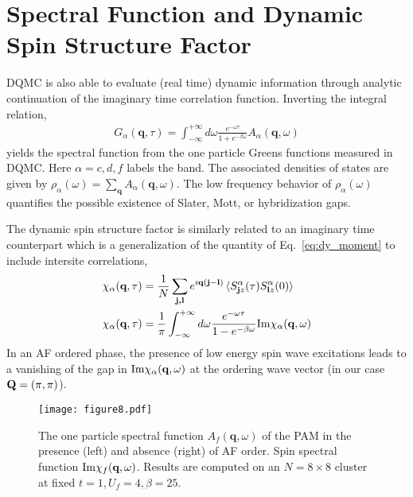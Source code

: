 \documentclass[pra,letterpaper,10pt,twocolumn]{revtex4}
\begin{document}
\section{Spectral Function and Dynamic Spin Structure Factor}

DQMC is also able to evaluate (real time) dynamic information through analytic
continuation\cite{jarrell96} of the imaginary time correlation function.
Inverting the integral relation,
\begin{align}
G_\alpha(\textbf{q},\tau)=\int_{-\infty}^{+\infty}d\omega
\frac{e^{-\omega \tau}}{1+e^{-\beta \omega}}
A_\alpha(\textbf{q},\omega)
\label{aqw}
\end{align}
yields the spectral function from the one particle Greens functions measured in
DQMC.  Here $\alpha=c,d,f$ labels the band.  The associated densities of
states are given by $\rho_\alpha(\omega) = \sum_{\textbf{q}} A_\alpha(\textbf{q},\omega)$.
The low frequency behavior of $\rho_\alpha(\omega)$ quantifies the
possible existence of Slater, Mott, or hybridization gaps.

The dynamic spin structure factor is similarly related to an imaginary
time counterpart which is a generalization of the quantity of
Eq.~\ref{eq:dy_moment} to include intersite correlations, 
\begin{align}
\chi_\alpha(\textbf{q},\tau)&=
\frac{1}{N} \sum_{\textbf{j,l}}
e^{i \textbf{q} (\textbf{j}-\textbf{l})}\,
\langle S^\alpha_{\textbf{j}z}(\tau)S^\alpha_{\textbf{l}z}(0) \rangle
\nonumber \\
\chi_\alpha(\textbf{q},\tau)&=\frac{1}{\pi}\int_{-\infty}^{+\infty} d\omega
\frac{e^{-\omega \tau}}{1-e^{-\beta \omega}} \textup{Im} \chi_\alpha(\textbf{q},\omega) \label{chiqw}
\end{align} 
In an AF ordered phase, the presence of low energy spin wave
excitations leads to a vanishing of the gap in $ \textup{Im} \chi_\alpha(\textbf{q},\omega)$
at the ordering wave vector (in our case ${\bf Q}=(\pi,\pi)$).

\begin{figure}[!h]
\texttt{[image: figure8.pdf]} 
\caption{ 
The one particle spectral function $A_f(\textbf{q}, \omega)$ of the PAM
in the
presence (left) and absence (right) of AF order. 
Spin spectral function $ \textup{Im}\chi_f(\textbf{q}, \omega)$. Results
are computed on an $N=8\times 8$ cluster at fixed $t=1,
U_f=4, \beta=25$. 
\label{fig:PAM_A_Chi}
}
\end{figure}
\end{document}
